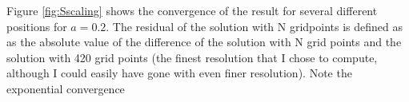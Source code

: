 \documentclass[aps,prd,amsmath,showpacs,amssymb,superscriptaddress,nofootinbib,longbibliography,eqsecnum,preprintnumbers]{revtex4-1}
\begin{document}
Figure \ref{fig:Sscaling} shows the convergence of the result for several different positions for $a=0.2$. The residual of the solution with N gridpoints is defined as as the absolute value of the difference of the solution with N grid points and the solution with 420 grid points (the finest resolution that I chose to compute, although I could easily have gone with even finer resolution). Note the exponential convergence






 

\end{document}
